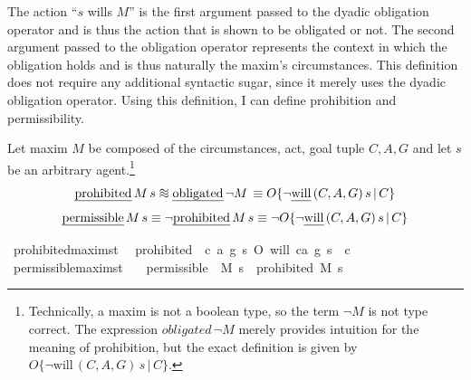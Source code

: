 \begin{isabellebody}
\begin{isamarkuptext}
The action ``$s$ wills $M$'' is the first argument passed to the dyadic obligation operator and is 
thus the action that is shown to be obligated or not. The second argument passed to the obligation 
operator represents the context in which the obligation holds and is thus naturally the maxim's circumstances.
This definition does not require any additional syntactic sugar, since it merely uses the dyadic obligation
operator. Using this definition, I can define prohibition and permissibility.

\begin{definition} Let maxim $M$ be composed of the circumstances, act, 
goal tuple $C, A, G$ and let $s$ be an arbitrary agent.\footnote{Technically, a maxim is not a boolean 
type, so the term $\neg M$ is not type correct. The expression $obligated \, \neg M$ merely provides 
intuition for the meaning of prohibition, but the exact definition is given by 
$O\{ \neg \text{will} \, (C, A, G) \, s \, | \, C\}$.}
\newcommand*{\approxident}{%
  \mathrel{\vcenter{\offinterlineskip
  \hbox{$\sim$}\vskip-.35ex\hbox{$\sim$}\vskip-.35ex\hbox{$\sim$}}}}
$$\text{\emph{prohibited}} \, M \, s \approxident \text{\emph{obligated}} \, \neg M \, \equiv O\{ \neg \text{\emph{will}} \, (C, A, G) \, s \, | \, C\}$$
$$\text{\emph{permissible}} \, M \, s \equiv \neg \text{\emph{prohibited}} \, M \, s \equiv \neg O\{ \neg \text{\emph{will}} \, (C, A, G) \, s \, | \, C\}$$
\end{definition}%
\end{isamarkuptext}\isamarkuptrue%
\isamarkupfalse%
\ prohibited{\isacharcolon}{\isacharcolon}{\isachardoublequoteopen}maxim{\isasymRightarrow}s{\isasymRightarrow}t{\isachardoublequoteclose}\ \ \isanewline
{\isachardoublequoteopen}prohibited\ {\isasymequiv}\ {\isasymlambda}{\isacharparenleft}c{\isacharcomma}\ a{\isacharcomma}\ g{\isacharparenright}\ s{\isachardot}\ O{\isacharbraceleft}\isactrlbold {\isasymnot}\ {\isacharparenleft}will\ {\isacharparenleft}c{\isacharcomma}a{\isacharcomma}\ g{\isacharparenright}\ s{\isacharparenright}\ {\isacharbar}\ c{\isacharbraceright}{\isachardoublequoteclose}\isanewline
%
\isanewline
{}\isamarkupfalse%
\ permissible{\isacharcolon}{\isacharcolon}{\isachardoublequoteopen}maxim{\isasymRightarrow}s{\isasymRightarrow}t{\isachardoublequoteclose}\isanewline
\ \ \ {\isachardoublequoteopen}permissible\ {\isasymequiv}\ {\isasymlambda}M\ s{\isachardot}\ \isactrlbold {\isasymnot}\ {\isacharparenleft}prohibited\ M\ s{\isacharparenright}{\isachardoublequoteclose}\isanewline

\end{isabellebody}
